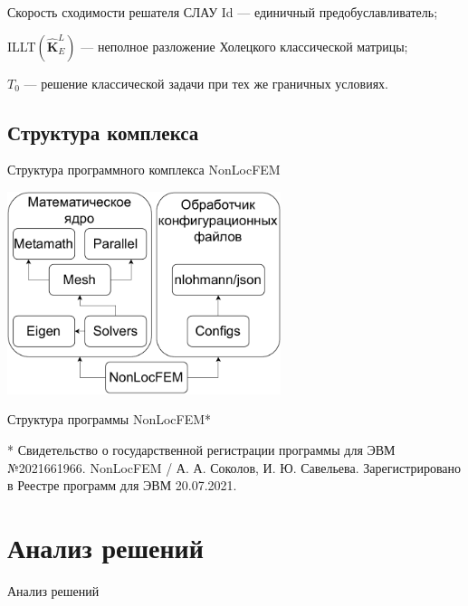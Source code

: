 \begin{frame}{Скорость сходимости решателя СЛАУ}
Id --- единичный предобуславливатель;

ILLT$\left( \widehat{\textbf{K}}^L_E \right)$ --- неполное разложение Холецкого классической матрицы;

$T_0$ --- решение классической задачи при тех же граничных условиях.
\end{frame}

\subsection{Структура комплекса}
\begin{frame}{Структура программного комплекса NonLocFEM}
\begin{center}
	\includegraphics[width=0.6\textwidth]{pics/NonLocFEMSchema.pdf}
	
	Структура программы NonLocFEM*
\end{center}
\justifying
* Свидетельство о государственной регистрации программы для ЭВМ \\
    №2021661966. NonLocFEM / А. А. Соколов, И. Ю. Савельева. Зарегистрировано в Реестре программ для ЭВМ 20.07.2021.
\normalsize
\end{frame}

\section{Анализ решений}

\begin{frame}
	\centering
	\Huge
	Анализ решений
\end{frame}

